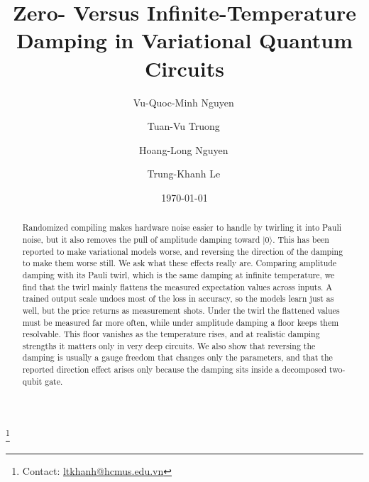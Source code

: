 \documentclass[
 aps,pra,
 twocolumn,
 superscriptaddress,
 longbibliography,
 nofootinbib
]{revtex4-2}
\makeatletter
\providecommand{\ket}[1]{\lvert #1 \rangle}
\newcommand{\authornote}{Contact:
\href{mailto:ltkhanh@hcmus.edu.vn}{ltkhanh@hcmus.edu.vn}}
\makeatother
\begin{document}
\title{Zero- Versus Infinite-Temperature Damping in Variational Quantum Circuits}

\author{Vu-Quoc-Minh Nguyen\,}

\author{Tuan-Vu Truong\,}

\author{Hoang-Long Nguyen\,}

\author{Trung-Khanh Le\,}
\thanks{\authornote}

\date{\today}

\begin{abstract}
Randomized compiling makes hardware noise easier to handle by twirling it into
Pauli noise, but it also removes the pull of amplitude damping toward
$\ket{0}$. This has been reported to make variational models worse, and
reversing the direction of the damping to make them worse still. We ask what
these effects really are. Comparing amplitude damping with its Pauli twirl,
which is the same damping at infinite temperature, we find that the twirl
mainly flattens the measured expectation values across inputs. A trained output
scale undoes most of the loss in accuracy, so the models learn just as well,
but the price returns as measurement shots. Under the twirl the flattened
values must be measured far more often, while under amplitude damping a floor
keeps them resolvable. This floor vanishes as the temperature rises, and at
realistic damping strengths it matters only in very deep circuits. We also show
that reversing the damping is usually a gauge freedom that changes only the
parameters, and that the reported direction effect arises only because the
damping sits inside a decomposed two-qubit gate.
\end{abstract}

\maketitle
\end{document}
